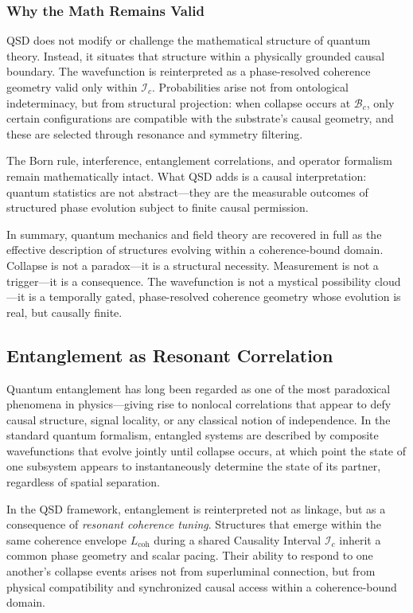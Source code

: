 \documentclass[entropy,article,submit,pdftex,moreauthors]{Definitions/mdpi}
\begin{document}
\subsubsection{Why the Math Remains Valid}

QSD does not modify or challenge the mathematical structure of quantum theory. Instead, it situates that structure within a physically grounded causal boundary. The wavefunction is reinterpreted as a phase-resolved coherence geometry valid only within \( \mathcal{I}_c \). Probabilities arise not from ontological indeterminacy, but from structural projection: when collapse occurs at \( \mathcal{B}_c \), only certain configurations are compatible with the substrate's causal geometry, and these are selected through resonance and symmetry filtering.

The Born rule, interference, entanglement correlations, and operator formalism remain mathematically intact. What QSD adds is a causal interpretation: quantum statistics are not abstract—they are the measurable outcomes of structured phase evolution subject to finite causal permission.

\smallskip

In summary, quantum mechanics and field theory are recovered in full as the effective description of structures evolving within a coherence-bound domain. Collapse is not a paradox—it is a structural necessity. Measurement is not a trigger—it is a consequence. The wavefunction is not a mystical possibility cloud—it is a temporally gated, phase-resolved coherence geometry whose evolution is real, but causally finite.


\subsection{Entanglement as Resonant Correlation}
\label{subsec:entanglement}

Quantum entanglement has long been regarded as one of the most paradoxical phenomena in physics—giving rise to nonlocal correlations that appear to defy causal structure, signal locality, or any classical notion of independence. In the standard quantum formalism, entangled systems are described by composite wavefunctions that evolve jointly until collapse occurs, at which point the state of one subsystem appears to instantaneously determine the state of its partner, regardless of spatial separation.

In the QSD framework, entanglement is reinterpreted not as linkage, but as a consequence of \textit{resonant coherence tuning}. Structures that emerge within the same coherence envelope \( L_{\text{coh}} \) during a shared Causality Interval \( \mathcal{I}_c \) inherit a common phase geometry and scalar pacing. Their ability to respond to one another’s collapse events arises not from superluminal connection, but from physical compatibility and synchronized causal access within a coherence-bound domain.
\end{document}
